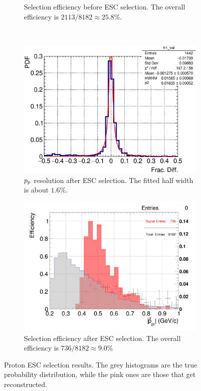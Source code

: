 \begin{figure}[t]
\begin{subfigure}{\dbfigwid\textwidth}
           \caption{Selection efficiency before ESC selection. The overall efficiency is $2113/8182\approx25.8\%$.}
           \label{subfig:ppr-eff-bfESC}
      \end{subfigure}
      \\
      \begin{subfigure}{\dbfigwid\textwidth}
           \includegraphics[width=\textwidth]{figures/sel/p_pr_res_pdf_al14_zoom.eps}
           \caption{$p_\textrm{p}$ resolution after ESC selection. The fitted half width is about $1.6\%$.}
           \label{subfig:ppr-res-afESC}
      \end{subfigure}
      \begin{subfigure}{\dbfigwid\textwidth}
           \includegraphics[width=\textwidth]{figures/sel/p_pr_eff_al14.png}
           \caption{Selection efficiency after ESC selection. The overall efficiency is $736/8182\approx9.0\%$}
           \label{subfig:ppr-eff-afESC}
      \end{subfigure}
      \caption{Proton ESC selection results. The grey histograms are the true probability distribution, while the pink ones are those that get reconstructed. }
      \label{fig:esc-ppr-reseff}
   \end{figure}


